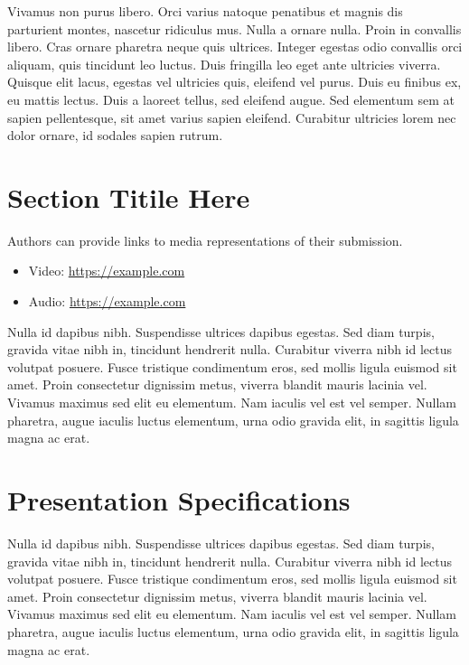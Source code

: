 \documentclass[acmsmall]{nimeart}
\begin{document}
Vivamus non purus libero. Orci varius natoque penatibus et magnis dis parturient montes, nascetur ridiculus mus. Nulla a ornare nulla. Proin in convallis libero. Cras ornare pharetra neque quis ultrices. Integer egestas odio convallis orci aliquam, quis tincidunt leo luctus. Duis fringilla leo eget ante ultricies viverra. Quisque elit lacus, egestas vel ultricies quis, eleifend vel purus. Duis eu finibus ex, eu mattis lectus. Duis a laoreet tellus, sed eleifend augue. Sed elementum sem at sapien pellentesque, sit amet varius sapien eleifend. Curabitur ultricies lorem nec dolor ornare, id sodales sapien rutrum.


\section{Section Titile Here}

Authors can provide links to media representations of their submission.

\begin{itemize}
	\item Video: \url{https://example.com}
	\item Audio: \url{https://example.com}
\end{itemize}

Nulla id dapibus nibh. Suspendisse ultrices dapibus egestas. Sed diam turpis, gravida vitae nibh in, tincidunt hendrerit nulla. Curabitur viverra nibh id lectus volutpat posuere. Fusce tristique condimentum eros, sed mollis ligula euismod sit amet. Proin consectetur dignissim metus, viverra blandit mauris lacinia vel. Vivamus maximus sed elit eu elementum. Nam iaculis vel est vel semper. Nullam pharetra, augue iaculis luctus elementum, urna odio gravida elit, in sagittis ligula magna ac erat.


\section{Presentation Specifications}

Nulla id dapibus nibh. Suspendisse ultrices dapibus egestas. Sed diam turpis, gravida vitae nibh in, tincidunt hendrerit nulla. Curabitur viverra nibh id lectus volutpat posuere. Fusce tristique condimentum eros, sed mollis ligula euismod sit amet. Proin consectetur dignissim metus, viverra blandit mauris lacinia vel. Vivamus maximus sed elit eu elementum. Nam iaculis vel est vel semper. Nullam pharetra, augue iaculis luctus elementum, urna odio gravida elit, in sagittis ligula magna ac erat.
\end{document}

